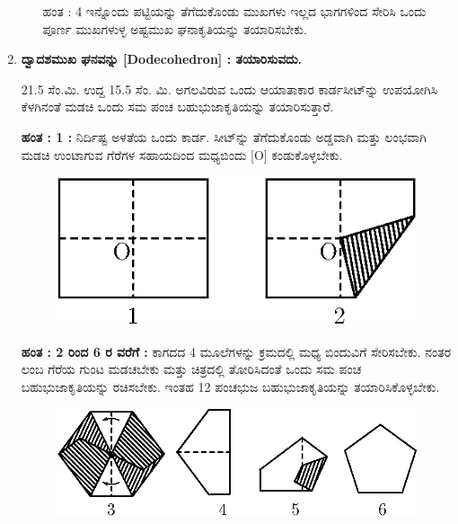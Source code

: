 \begin{enumerate}
\begin{itemize}
\item[ಹಂತ : 4] ಇನ್ನೊಂದು ಪಟ್ಟಿಯನ್ನು ತೆಗೆದುಕೊಂಡು ಮುಖಗಳು ಇಲ್ಲದ ಭಾಗಗಳಿಂದ ಸೇರಿಸಿ ಒಂದು ಪೂರ್ಣ ಮುಖಗಳುಳ್ಳ ಅಷ್ಟಮುಖ ಘನಾಕೃತಿಯನ್ನು ತಯಾರಿಸಬೇಕು.
\end{itemize}

\eject

\item \textbf{ದ್ವಾದಶಮುಖ ಘನವನ್ನು [Dodecohedron] : ತಯಾರಿಸುವದು.}
 
 21.5 ಸೆಂ.ಮಿ. ಉದ್ದ 15.5 ಸೆಂ. ಮಿ. ಅಗಲವಿರುವ ಒಂದು ಆಯಾತಾಕಾರ ಕಾರ್ಡಸೀಟ್‌ನ್ನು ಉಪಯೋಗಿಸಿ ಕೆಳಗಿನಂತೆ ಮಡಚಿ ಒಂದು ಸಮ ಪಂಚ ಬಹುಭುಜಾಕೃತಿಯನ್ನು ತಯಾರಿಸುತ್ತಾರೆ. 
 
 \noindent
 {\bf ಹಂತ : 1 :} ನಿರ್ದಿಷ್ಟ ಅಳತೆಯ ಒಂದು ಕಾರ್ಡ. ಸೀಟ್‌ನ್ನು ತೆಗೆದುಕೊಂಡು ಅಡ್ಡವಾಗಿ ಮತ್ತು ಲಂಭವಾಗಿ ಮಡಚಿ ಉಂಟಾಗುವ ಗೆರೆಗಳ ಸಹಾಯದಿಂದ ಮಧ್ಯಬಿಂದು  [O] ಕಂಡುಕೊಳ್ಳಬೇಕು. 
 \begin{figure}[H]
\centering
\includegraphics[scale=.9]{src/figure/chap1/fig1-21a.eps}
\end{figure}

 \noindent
 {\bf ಹಂತ : 2 ರಿಂದ 6 ರ ವರೆಗೆ :} ಕಾಗದದ 4 ಮೂಲೆಗಳನ್ನು ಕ್ರಮದಲ್ಲಿ ಮಧ್ಯ ಬಿಂದುವಿಗೆ ಸೇರಿಸಬೇಕು. ನಂತರ ಲಂಬ ಗೆರೆಯ ಗುಂಟ ಮಡಚಬೇಕು ಮತ್ತು ಚಿತ್ರದಲ್ಲಿ ತೋರಿಸಿದಂತೆ ಒಂದು ಸಮ ಪಂಚ ಬಹುಭುಜಾಕೃತಿಯನ್ನು ರಚಿಸಬೇಕು. ಇಂತಹ  12 ಪಂಚಭುಜ ಬಹುಭುಜಾಕೃತಿಯನ್ನು ತಯಾರಿಸಿಕೊಳ್ಳಬೇಕು. 
  \begin{figure}[H]
\centering
\includegraphics[scale=.9]{src/figure/chap1/fig1-21b.eps}
\end{figure}


\end{enumerate}
